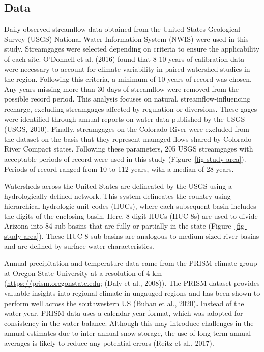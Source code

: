\documentclass[
]{agujournal2019}
\begin{document}
\subsection{Data}\label{sec-data}

Daily observed streamflow data obtained from the United States
Geological Survey (USGS) National Water Information System (NWIS) were
used in this study. Streamgages were selected depending on criteria to
ensure the applicability of each site. O'Donnell et al. (2016) found
that 8-10 years of calibration data were necessary to account for
climate variability in paired watershed studies in the region. Following
this criteria, a minimum of 10 years of record was chosen. Any years
missing more than 30 days of streamflow were removed from the possible
record period. This analysis focuses on natural, streamflow-influencing
recharge, excluding streamgages affected by regulation or diversions.
These gages were identified through annual reports on water data
published by the USGS (USGS, 2010). Finally, streamgages on the Colorado
River were excluded from the dataset on the basis that they represent
managed flows shared by Colorado River Compact states. Following these
parameters, 205 USGS streamgages with acceptable periods of record were
used in this study (Figure~\ref{fig-study-area}). Periods of record
ranged from 10 to 112 years, with a median of 28 years.

Watersheds across the United States are delineated by the USGS using a
hydrologically-defined network. This system delineates the country using
hierarchical hydrologic unit codes (HUCs), where each subsequent basin
includes the digits of the enclosing basin. Here, 8-digit HUCs (HUC 8s)
are used to divide Arizona into 84 sub-basins that are fully or
partially in the state (Figure~\ref{fig-study-area}). These HUC 8
sub-basins are analogous to medium-sized river basins and are defined by
surface water characteristics.

Annual precipitation and temperature data came from the PRISM climate
group at Oregon State University at a resolution of 4 km
(\url{https://prism.oregonstate.edu;} (Daly et al., 2008)). The PRISM
dataset provides valuable insights into regional climate in ungauged
regions and has been shown to perform well across the southwestern US
(Buban et al., 2020)\textbf{.} Instead of the water year, PRISM data
uses a calendar-year format, which was adopted for consistency in the
water balance. Although this may introduce challenges in the annual
estimates due to inter-annual snow storage, the use of long-term annual
averages is likely to reduce any potential errors (Reitz et al., 2017).
\end{document}
